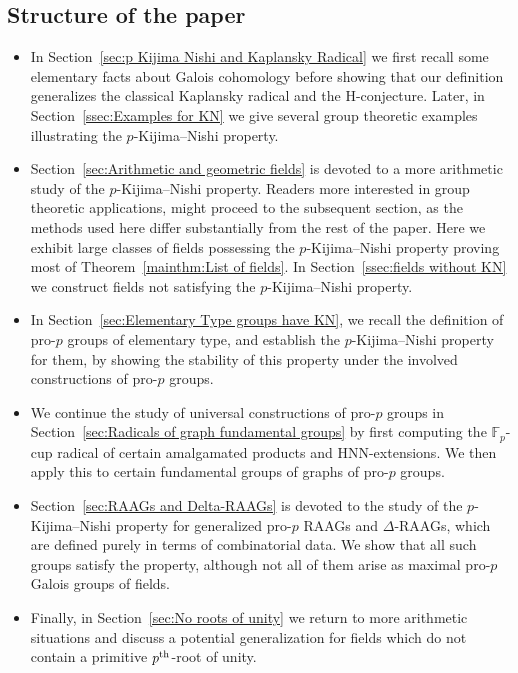 \documentclass{amsart}
\theoremstyle{definition}
\theoremstyle{remark}
\newcommand{\FF}{\mathbb{F}}
\newcommand{\pth}{{p^{\rm th}}}
\begin{document}
\subsection*{Structure of the paper}
\begin{itemize}
    \item In Section~\ref{sec:p Kijima Nishi and Kaplansky Radical} we first recall some elementary facts about Galois cohomology before showing that our definition generalizes the classical Kaplansky radical and the H-conjecture. Later, in Section~\ref{ssec:Examples for KN} we give several group theoretic examples illustrating the $p$-Kijima--Nishi property.
    \item Section~\ref{sec:Arithmetic and geometric fields} is devoted to a more arithmetic study of the $p$-Kijima--Nishi property. Readers more interested in group theoretic applications, might proceed to the subsequent section, as the methods used here differ substantially from the rest of the paper. Here we exhibit large classes of fields possessing the $p$-Kijima--Nishi property proving most of Theorem~\ref{mainthm:List of fields}. In Section~\ref{ssec:fields without KN} we construct fields not satisfying the $p$-Kijima--Nishi property. 
    \item In Section~\ref{sec:Elementary Type groups have KN}, we recall the definition of pro-$p$ groups of elementary type, and establish the $p$-Kijima--Nishi property for them, by showing  the stability of this property under the involved constructions of pro-$p$ groups.
    \item We continue the study of universal constructions of pro-$p$ groups in Section~\ref{sec:Radicals of graph fundamental groups} by first computing the $\FF_p$-cup radical of certain amalgamated products and HNN-extensions. We then apply this to certain fundamental groups of graphs of pro-$p$ groups.
    \item Section~\ref{sec:RAAGs and Delta-RAAGs} is devoted to the study of the $p$-Kijima--Nishi property for generalized pro-$p$ RAAGs and $\Delta$-RAAGs, which are defined purely in terms of combinatorial data. We show that all such groups satisfy the property, although not all of them arise as maximal pro-$p$ Galois groups of fields.
    \item Finally, in Section~\ref{sec:No roots of unity} we return to more arithmetic situations and discuss a potential generalization for fields which do not contain a primitive $\pth$-root of unity.
\end{itemize}
\end{document}
